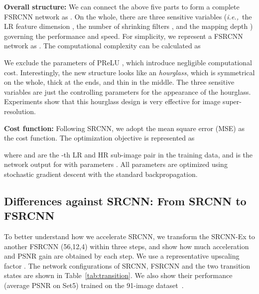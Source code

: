 \documentclass[runningheads]{llncs}
\newcommand{\ie}{\emph{i.e.,}}
\begin{document}
\noindent
\textbf{Overall structure:} We can connect the above five parts to form a complete FSRCNN network as .
On the whole, there are three sensitive variables (\ie~the LR feature dimension , the number of shrinking filters , and the mapping depth ) governing the performance and speed. For simplicity, we represent a FSRCNN network as . The computational complexity can be calculated as

We exclude the parameters of PReLU , which introduce negligible computational cost.
Interestingly, the new structure looks like an \textit{hourglass}, which is symmetrical on the whole, thick at the ends, and thin in the middle. The three sensitive variables are just the controlling parameters for the appearance of the hourglass. Experiments show that this hourglass design is very effective for image super-resolution.

\noindent
\textbf{Cost function:} Following SRCNN, we adopt the mean square error (MSE) as the cost function. The optimization objective is represented as

where  and  are the -th LR and HR sub-image pair in the training data, and  is the network output for  with parameters . All parameters are optimized using stochastic gradient descent with the standard backpropagation.


\subsection{Differences against SRCNN: From SRCNN to FSRCNN}
\label{sec:parameters}
To better understand how we accelerate SRCNN, we transform the SRCNN-Ex to another FSRCNN (56,12,4) within three steps, and show how much acceleration and PSNR gain are obtained by each step. We use a representative upscaling factor . The network configurations of SRCNN, FSRCNN and the two transition states are shown in Table~\ref{tab:transition}. We also show their performance (average PSNR on Set5) trained on the 91-image dataset~\cite{Yang2010a}.
\end{document}
